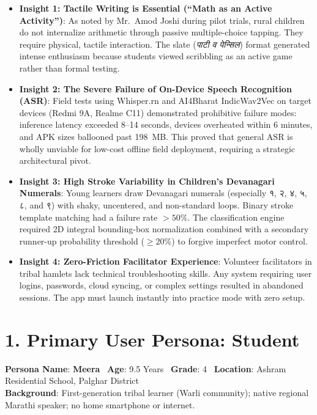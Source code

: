 \documentclass[10pt,a4paper]{article}
\begin{document}
\begin{itemize}[itemsep=3pt]
    \item \textbf{Insight 1: Tactile Writing is Essential (``Math as an Active Activity'')}: As noted by Mr.~Amod Joshi during pilot trials, rural children do not internalize arithmetic through passive multiple-choice tapping. They require physical, tactile interaction. The slate (\textit{पाटी व पेन्सिल}) format generated intense enthusiasm because students viewed scribbling as an active game rather than formal testing.
    \item \textbf{Insight 2: The Severe Failure of On-Device Speech Recognition (ASR)}: Field tests using Whisper.rn and AI4Bharat IndicWav2Vec on target devices (Redmi 9A, Realme C11) demonstrated prohibitive failure modes: inference latency exceeded 8--14 seconds, devices overheated within 6 minutes, and APK sizes ballooned past 198~MB. This proved that general ASR is wholly unviable for low-cost offline field deployment, requiring a strategic architectural pivot.
    \item \textbf{Insight 3: High Stroke Variability in Children's Devanagari Numerals}: Young learners draw Devanagari numerals (especially १, २, ४, ५, ८, and ९) with shaky, uncentered, and non-standard loops. Binary stroke template matching had a failure rate $>50\%$. The classification engine required 2D integral bounding-box normalization combined with a secondary runner-up probability threshold ($\ge 20\%$) to forgive imperfect motor control.
    \item \textbf{Insight 4: Zero-Friction Facilitator Experience}: Volunteer facilitators in tribal hamlets lack technical troubleshooting skills. Any system requiring user logins, passwords, cloud syncing, or complex settings resulted in abandoned sessions. The app must launch instantly into practice mode with zero setup.
\end{itemize}

\clearpage

\section*{1. Primary User Persona: Student}

\begin{tcolorbox}[colback=slatebg,colframe=secondary,boxrule=0.7pt,arc=2pt,left=5pt,right=5pt,top=3pt,bottom=3pt]
\scriptsize
\textbf{Persona Name}: \textbf{Meera} \textbar\ \textbf{Age}: 9.5 Years \textbar\ \textbf{Grade}: 4 \textbar\ \textbf{Location}: Ashram Residential School, Palghar District \\
\textbf{Background}: First-generation tribal learner (Warli community); native regional Marathi speaker; no home smartphone or internet.
\end{tcolorbox}
\end{document}
